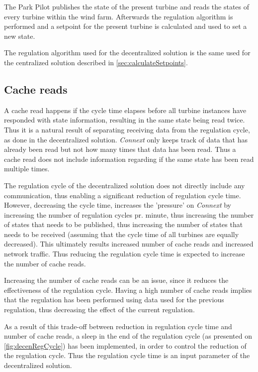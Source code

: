 The Park Pilot publishes the state of the present turbine and reads the states of every turbine within the wind farm. Afterwards the regulation algorithm is performed and a setpoint for the present turbine is calculated and used to set a new state.

The regulation algorithm used for the decentralized solution is the same used for the centralized solution described in \cref{sec:calculateSetpoints}.

\subsection{Cache reads}

A cache read happens if the cycle time elapses before all turbine instances have responded with state information, resulting in the same state being read twice. Thus it is a natural result of separating receiving data from the regulation cycle, as done in the decentralized solution. \textit{Connext} only keeps track of data that has already been read but not how many times that data has been read. Thus a cache read does not include information regarding if the same state has been read multiple times.

The regulation cycle of the decentralized solution does not directly include any communication, thus enabling a significant reduction of regulation cycle time. However, decreasing the cycle time, increases the 'pressure' on \textit{Connext} by increasing the number of regulation cycles pr. minute, thus increasing the number of states that needs to be published, thus increasing the number of states that needs to be received (assuming that the cycle time of all turbines are equally decreased). This ultimately results increased number of cache reads and increased network traffic. Thus reducing the regulation cycle time is expected to increase the number of cache reads.  

Increasing the number of cache reads can be an issue, since it reduces the effectiveness of the regulation cycle. Having a high number of cache reads implies that the regulation has been performed using data used for the previous regulation, thus decreasing the effect of the current regulation.

As a result of this trade-off between reduction in regulation cycle time and number of cache reads, a sleep in the end of the regulation cycle (as presented on \cref{fig:decenRegCycle}) has been implemented, in order to control the reduction of the regulation cycle. Thus the regulation cycle time is an input parameter of the decentralized solution.

